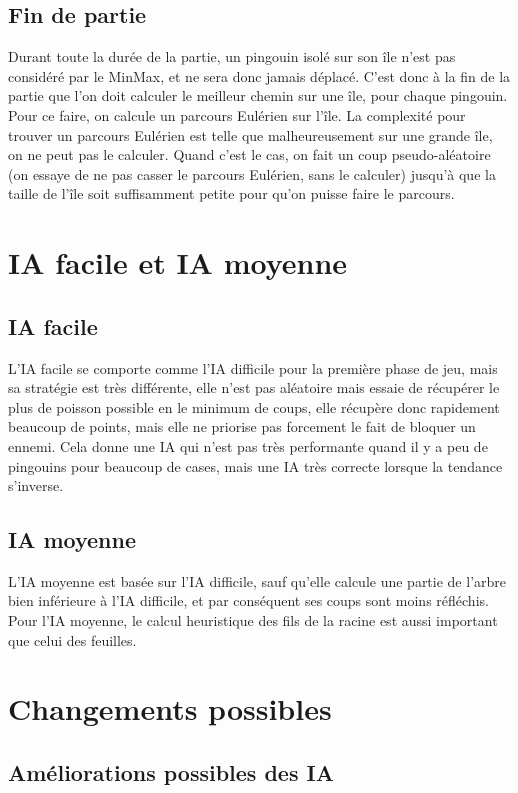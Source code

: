 \documentclass{report}
\begin{document}
\section{Fin de partie}
Durant toute la durée de la partie, un pingouin isolé sur son île n'est pas considéré par le MinMax, et ne sera donc jamais déplacé.
C'est donc à la fin de la partie que l'on doit calculer le meilleur chemin sur une île, pour chaque pingouin.
\newline 
Pour ce faire, on calcule un parcours Eulérien sur l'île. La complexité pour trouver un parcours Eulérien est telle que malheureusement sur une grande île, on ne peut pas le calculer. Quand c'est le cas, on fait un coup pseudo-aléatoire (on essaye de ne pas casser le parcours Eulérien, sans le calculer) jusqu'à que la taille de l'île soit suffisamment petite pour qu'on puisse faire le parcours.

\chapter{IA facile et IA moyenne}
\section{IA facile}
L'IA facile se comporte comme l'IA difficile pour la première phase de jeu, mais sa stratégie est très différente, elle n'est pas aléatoire mais essaie de récupérer le plus de poisson possible en le minimum de coups, elle récupère donc rapidement beaucoup de points, mais elle ne priorise pas forcement le fait de bloquer un ennemi.
Cela donne une IA qui n'est pas très performante quand il y a peu de pingouins pour beaucoup de cases, mais une IA très correcte lorsque la tendance s'inverse.

\section{IA moyenne}
L'IA moyenne est basée sur l'IA difficile, sauf qu'elle calcule une partie de l'arbre bien inférieure à l'IA difficile, et par conséquent ses coups sont moins réfléchis.
Pour l'IA moyenne, le calcul heuristique des fils de la racine est aussi important que celui des feuilles.


\chapter{Changements possibles}
\section{Améliorations possibles des IA}
\end{document}
